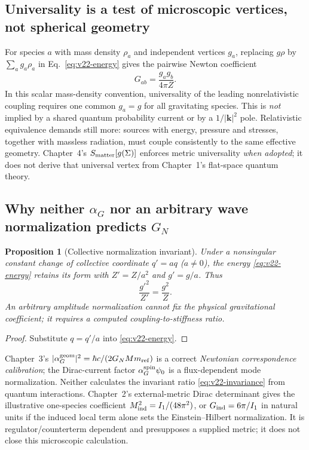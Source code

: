 \documentclass[11pt,a4paper]{article}
\newtheorem{proposition}[theorem]{Proposition}
\theoremstyle{remark}\newtheorem{remark}[theorem]{Remark}
\begin{document}
\subsection{Universality is a test of microscopic vertices, not spherical geometry}
For species $a$ with mass density $\rho_a$ and independent vertices $g_a$, replacing $g\rho$ by $\sum_a g_a\rho_a$ in Eq.~\eqref{eq:v22-energy} gives the pairwise Newton coefficient
\begin{equation}\label{eq:v22-pair}
 \boxed{G_{ab}=\frac{g_ag_b}{4\pi Z}.}
\end{equation}
In this scalar mass-density convention, universality of the leading nonrelativistic coupling requires one common $g_a=g$ for all gravitating species. This is \emph{not} implied by a shared quantum probability current or by a $1/|\bm k|^2$ pole. Relativistic equivalence demands still more: sources with energy, pressure and stresses, together with massless radiation, must couple consistently to the same effective geometry. Chapter~4's $S_{\rm matter}[g(\Sigma)]$ enforces metric universality \emph{when adopted}; it does not derive that universal vertex from Chapter~1's flat-space quantum theory.

\subsection{Why neither $\alpha_G$ nor an arbitrary wave normalization predicts $G_N$}
\begin{proposition}[Collective normalization invariant]\label{prop:v22-invariance}
Under a nonsingular constant change of collective coordinate $q'=a q$ ($a\ne0$), the energy \eqref{eq:v22-energy} retains its form with $Z'=Z/a^2$ and $g'=g/a$. Thus
\begin{equation}\label{eq:v22-invariance}
 \boxed{\frac{g'^2}{Z'}=\frac{g^2}{Z}.}
\end{equation}
An arbitrary amplitude normalization cannot fix the physical gravitational coefficient; it requires a computed coupling-to-stiffness ratio.
\end{proposition}
\begin{proof} Substitute $q=q'/a$ into \eqref{eq:v22-energy}.\end{proof}
Chapter~3's $|\alpha_G^{\rm geom}|^2=\hbar c/(2G_NM m_{\rm ref})$ is a correct \emph{Newtonian correspondence calibration}; the Dirac-current factor $\alpha_G^{\rm spin}\psi_0$ is a flux-dependent mode normalization. Neither calculates the invariant ratio \eqref{eq:v22-invariance} from quantum interactions. Chapter~2's external-metric Dirac determinant gives the illustrative one-species coefficient $M_{\rm ind}^2=I_1/(48\pi^2)$, or $G_{\rm ind}=6\pi/I_1$ in natural units if the induced local term alone sets the Einstein--Hilbert normalization. It is regulator/counterterm dependent and presupposes a supplied metric; it does not close this microscopic calculation.
\end{document}
